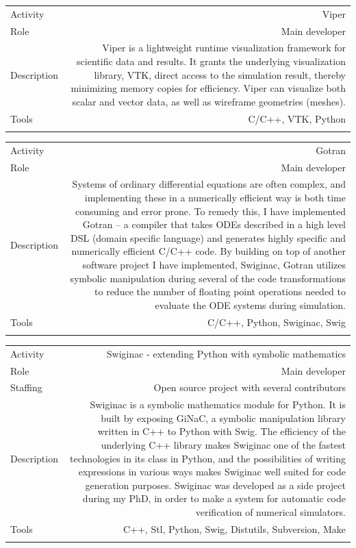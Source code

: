 \documentclass[english,a4paper,11pt]{article}
\begin{document}
\begin{tabular}{@{}LR}
Activity & Viper\\
Role & Main developer\\
Description & Viper is a lightweight runtime visualization framework for scientific data and results. It grants the underlying visualization library, VTK, direct access to the simulation result, thereby minimizing memory copies for efficiency. Viper can visualize both scalar and vector data, as well as wireframe geometries (meshes).\\
Tools & C/C++, VTK, Python\\ 
\addlinespace \bottomrule[.1pt] \addlinespace
   \end{tabular}

\begin{tabular}{@{}LR}
Activity & Gotran\\
Role & Main developer\\
Description & Systems of ordinary differential equations are often complex, and implementing these in a numerically efficient way is both time consuming and error prone. To remedy this, I have implemented Gotran – a compiler that takes ODEs described in a high level DSL (domain specific language) and generates highly specific and numerically efficient C/C++ code. By building on top of another software project I have implemented, Swiginac, Gotran utilizes symbolic manipulation during several of the code transformations to reduce the number of floating point operations needed to evaluate the ODE systems during simulation.\\
Tools & C/C++, Python, Swiginac, Swig\\ 
\addlinespace \bottomrule[.1pt] \addlinespace
   \end{tabular}

\begin{tabular}{@{}LR}
Activity & Swiginac - extending Python with symbolic mathematics\\
Role & Main developer\\
Staffing & Open source project with several contributors\\
Description & Swiginac is a symbolic mathematics module for Python. It is built by exposing GiNaC, a symbolic manipulation library written in C++ to Python with Swig. The efficiency of the underlying C++ library makes Swiginac one of the fastest technologies in its class in Python, and the possibilities of writing expressions in various ways makes Swiginac well suited for code generation purposes. Swiginac was developed as a side project during my PhD, in order to make a system for automatic code verification of numerical simulators.\\
Tools & C++, Stl, Python, Swig, Distutils, Subversion, Make\\ 
\addlinespace \bottomrule[.1pt] \addlinespace
   \end{tabular}
\end{document}
